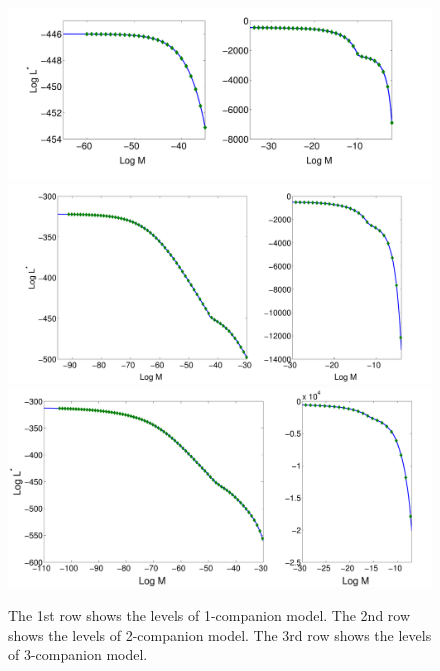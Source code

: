 \documentclass[letterpaper, preprint]{aastex}
\begin{document}
\begin{figure}
 \centering
 \includegraphics[width=0.99\linewidth]{Level_122_mod_1.pdf}\\
 \includegraphics[width=0.9\linewidth]{Level_122_mod_2.pdf}\\
\includegraphics[width=0.9\linewidth]{Level_122_mod_3.pdf}
\caption{The 1st row shows the levels of 1-companion model. The 2nd row shows the levels of 2-companion model. The 3rd row shows the levels of 3-companion model.}
 \label{fig:levels-122}
\end{figure}
\end{document}
